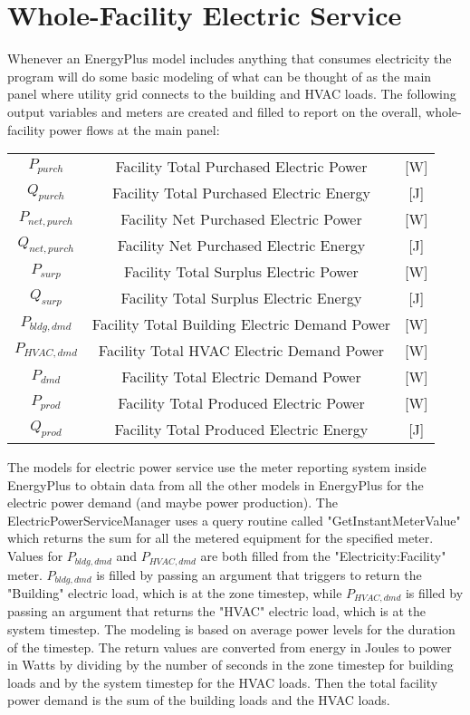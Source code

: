 \section{Whole-Facility Electric Service}\label{section-whole-facility-electric-service}

Whenever an EnergyPlus model includes anything that consumes electricity the program will do some basic modeling of what can be thought of as the main panel where utility grid connects to the building and HVAC loads.  The following output variables and meters are created and filled to report on the overall, whole-facility power flows at the main panel: 

\begin{tabular}{c|c|c}
  $ {P_{purch}}  $ &    Facility Total Purchased Electric Power & [W] \tabularnewline
  $ {Q_{purch}}  $ &    Facility Total Purchased Electric Energy & [J] \tabularnewline
  $ {P_{net,purch}}  $ &    Facility Net Purchased Electric Power & [W] \tabularnewline
  $ {Q_{net,purch}}  $ &    Facility Net Purchased Electric Energy & [J] \tabularnewline
  $ {P_{surp}}  $ &    Facility Total Surplus Electric Power & [W] \tabularnewline
  $ {Q_{surp}}  $ &    Facility Total Surplus Electric Energy & [J] \tabularnewline
  $ {P_{bldg,dmd}}  $ &    Facility Total Building Electric Demand Power & [W] \tabularnewline
  $ {P_{HVAC,dmd}}  $ &    Facility Total HVAC Electric Demand Power & [W] \tabularnewline
  $ {P_{dmd}}  $ &    Facility Total Electric Demand Power & [W] \tabularnewline
  $ {P_{prod}}  $ &    Facility Total Produced Electric Power & [W] \tabularnewline
  $ {Q_{prod}}  $ &   Facility Total Produced Electric Energy & [J]
\end{tabular}

The models for electric power service use the meter reporting system inside EnergyPlus to obtain data from all the other models in EnergyPlus for the electric power demand (and maybe power production).  The ElectricPowerServiceManager uses a query routine called "GetInstantMeterValue" which returns the sum for all the metered equipment for the specified meter.  Values for   $P_{bldg,dmd}$ and $P_{HVAC,dmd}$ are both filled from the "Electricity:Facility" meter.  $P_{bldg,dmd}$ is filled by passing an argument that triggers to return the "Building" electric load, which is at the zone timestep, while $P_{HVAC,dmd}$ is filled by passing an argument that returns the "HVAC" electric load, which is at the system timestep.  The modeling is based on average power levels for the duration of the timestep. The return values are converted from energy in Joules to power in Watts by dividing by the number of seconds in the zone timestep for building loads and by the system timestep for the HVAC loads.  Then the total facility power demand is the sum of the building loads and the HVAC loads. 

